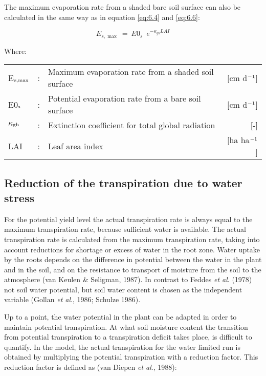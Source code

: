 The maximum evaporation rate from a shaded bare soil surface can also be calculated in
the same way as in equation \ref{eq:6.4} and \ref{eq:6.6}:

\begin{equation}
\label{eq:6.7}
E_{s,\max } ~=~ E0 _{s} \,\,\, e ^{-\kappa  _{gb} LAI}
\end{equation}

Where:\\[5pt]
\begin{tabularx}{\textwidth}{llXr}
	E$_{{\rm s,max}}$ &:& Maximum evaporation rate from a shaded 
	soil surface & [cm d$^{{\rm -1}}$]\\
	E0$_{{\rm s}}$ &:& Potential evaporation rate from a bare soil 
	surface & [cm d$^{{\rm -1}}$]\\
	$\kappa$$_{{\rm gb}}$ &:& Extinction coefficient for total global radiation & [-]\\
	LAI &:& Leaf area index & [ha ha$^{{\rm -1}}$]\\
\end{tabularx}

\subsection{Reduction of the transpiration due to water stress}

For the potential yield level the actual transpiration rate is always equal to the maximum
transpiration rate, because sufficient water is available. The actual transpiration rate is
calculated from the maximum transpiration rate, taking into account reductions for
shortage or excess of water in the root zone. Water uptake by the roots depends on the
difference in potential between the water in the plant and in the soil, and on the resistance
to transport of moisture from the soil to the atmosphere (van Keulen \& Seligman, 1987).
In contrast to Feddes {\it et al}. (1978) not soil water potential, but soil water content is
chosen as the independent variable (Gollan {\it et al}., 1986; Schulze 1986).

Up to a point, the water potential in the plant can be adapted in order to maintain
potential transpiration. At what soil moisture content the transition from potential
transpiration to a transpiration deficit takes place, is difficult to quantify. In the model,
the actual transpiration for the water limited run is obtained by multiplying the potential
transpiration with a reduction factor. This reduction factor is defined as (van Diepen {\it et al}., 1988):

